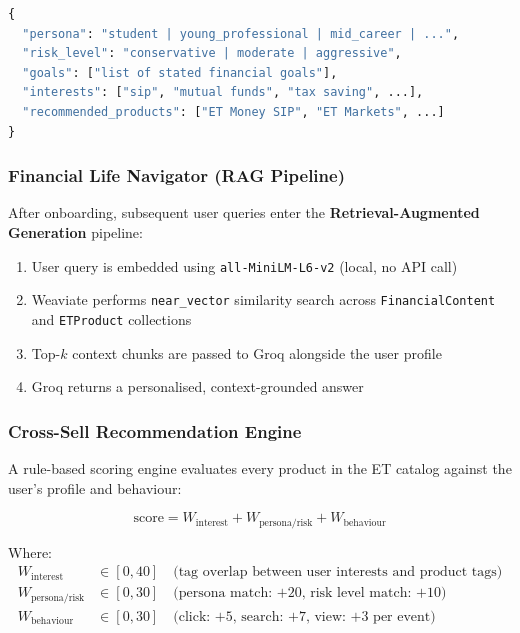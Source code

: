 \documentclass[12pt,a4paper]{article}
\begin{document}
\begin{lstlisting}[language=Python, caption=Extracted Profile Schema]
{
  "persona": "student | young_professional | mid_career | ...",
  "risk_level": "conservative | moderate | aggressive",
  "goals": ["list of stated financial goals"],
  "interests": ["sip", "mutual funds", "tax saving", ...],
  "recommended_products": ["ET Money SIP", "ET Markets", ...]
}
\end{lstlisting}

\subsubsection{Financial Life Navigator (RAG Pipeline)}
After onboarding, subsequent user queries enter the \textbf{Retrieval-Augmented Generation} pipeline:

\begin{enumerate}[noitemsep]
  \item User query is embedded using \texttt{all-MiniLM-L6-v2} (local, no API call)
  \item Weaviate performs \texttt{near\_vector} similarity search across \texttt{FinancialContent} and \texttt{ETProduct} collections
  \item Top-$k$ context chunks are passed to Groq alongside the user profile
  \item Groq returns a personalised, context-grounded answer
\end{enumerate}

\subsubsection{Cross-Sell Recommendation Engine}
A rule-based scoring engine evaluates every product in the ET catalog against the user's profile and behaviour:

\begin{equation}
\text{score} = W_{\text{interest}} + W_{\text{persona/risk}} + W_{\text{behaviour}}
\end{equation}

Where:
\begin{align*}
W_{\text{interest}}         &\in [0, 40] \quad \text{(tag overlap between user interests and product tags)} \\
W_{\text{persona/risk}}     &\in [0, 30] \quad \text{(persona match: +20, risk level match: +10)} \\
W_{\text{behaviour}}        &\in [0, 30] \quad \text{(click: +5, search: +7, view: +3 per event)}
\end{align*}
\end{document}
